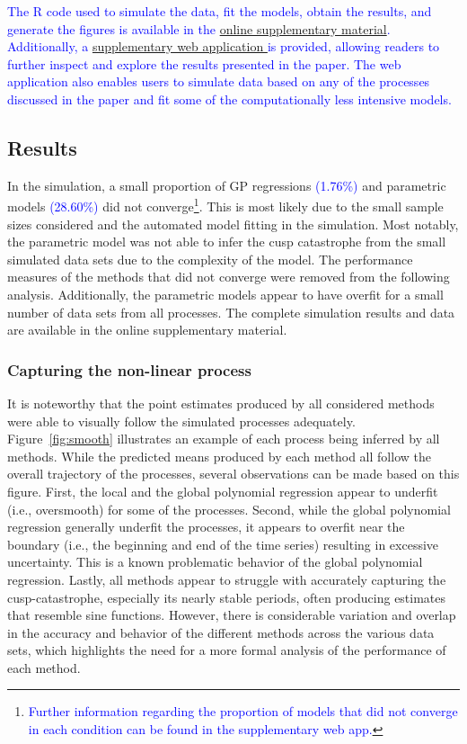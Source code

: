 \documentclass[man, floatsintext]{apa7}
\begin{document}
\textcolor{blue}{
  The R code used to simulate the data, fit the models, obtain
  the results, and generate the figures is available in the
  \href{https://osf.io/3ytdx/}{online supplementary material}. Additionally, a
  \href{https://jan-ian-failenschmid.shinyapps.io/modeling_non_linearity_app/}{
    supplementary web application } is provided, allowing readers to further
  inspect and explore the results presented in the paper. The web application
  also enables users to simulate data based on any of the processes discussed
  in
  the paper and fit some of the computationally less intensive models.
}

\subsection{Results}

In the simulation, a small proportion of GP regressions
\textcolor{blue}{(1.76\%)} and parametric models \textcolor{blue}{(28.60\%)}
did not converge\footnote{\textcolor{blue}{Further information regarding the
    proportion of models that did not converge in each condition can be found
    in the supplementary web app.}}. This is most likely due to the small
sample
sizes considered
and the automated model fitting in the simulation. Most notably, the parametric
model was not able to infer the cusp catastrophe from the small simulated data
sets due to the complexity of the model. The performance measures of the
methods that did not converge were removed from the following analysis.
Additionally, the parametric models appear to have overfit for a small number
of data sets from all processes. The complete simulation results and data are
available in the online supplementary material.

\subsubsection{Capturing the non-linear process}

It is noteworthy that the point estimates produced by all considered methods
were able to visually follow the simulated processes adequately.
Figure~\ref{fig:smooth} illustrates an example of each process being inferred
by all methods. While the predicted means produced by each method all follow
the overall trajectory of the processes, several observations can be made based
on this figure. First, the local and the global polynomial regression appear to
underfit (i.e., oversmooth) for some of the processes. Second, while the global
polynomial regression generally underfit the processes, it appears to overfit
near the boundary (i.e., the beginning and end of the time series) resulting in
excessive uncertainty. This is a known problematic behavior of the global
polynomial regression. Lastly, all methods appear to struggle with accurately
capturing the cusp-catastrophe, especially its nearly stable periods, often
producing estimates that resemble sine functions. However, there is
considerable variation and overlap in the accuracy and behavior of the
different methods across the various data sets, which highlights the need for a
more formal analysis of the performance of each method.
\end{document}
